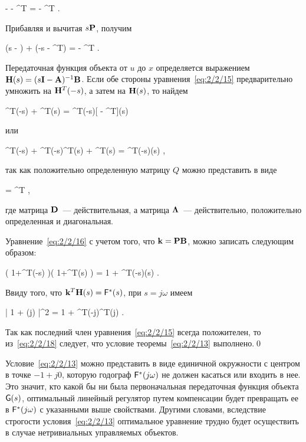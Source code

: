     -  - ^T =  -  ^T \mbox{.}
\eeq

Прибавляя и вычитая $s\mathbf{P}$, получим

    (s - ) + (-s - ^T) =  - ^T \mbox{.}
\eeq

Передаточная функция объекта от $u$ до $x$ определяется выражением $\mathbf{H}(s) = (s\mathbf{I}-\mathbf{A})^{-1}\mathbf{B}$. Если обе стороны уравнения~\vref{eq:2/2/15} предварительно умножить на $\mathbf{H}^T(-s)$, а затем на $\mathbf{H}(s)$, то найдем

\beqn
    ^T(-s)  + ^T(s) = ^T(-s)[ - ^T](s)
\eeqn

или

    ^T(-s) + ^T(-s)^T(s) + ^T(s) = ^T(-s)(s) \mbox{,}
\eeq

так как положительно определенную матрицу $Q$ можно представить в виде\cite{BELLMAN2}

\beqn
     = ^T\m{\Lambda} \mbox{,}
\eeqn

где матрица $\mathbf{D}$~--- действительная, а матрица $\mathbf{\Lambda}$~--- действительно, положительно определенная и диагональная.

Уравнение~\ref{eq:2/2/16} с учетом того, что $\mathbf{k} = \mathbf{P}\mathbf{B}$, можно записать следующим образом:

    \bigl( 1+^T(-s) \bigr)\bigl( 1+^T(s) \bigr) = 1 + ^T(-s)\m{\Lambda}(s) \mbox{.}
\eeq

Ввиду того, что $\mathbf{k}^T\mathbf{H}(s) = \mathsf{F}^{*}(s)$, при $s = j\omega$ имеем

    \bigl| 1 + \funcT(j\omega) \bigr|^2 = 1 + ^T(-j\omega)^T\m{\Lambda}(j\omega) \mbox{.}
\eeq

Так как последний член уравнения~\vref{eq:2/2/15} всегда положителен, то из~\ref{eq:2/2/18} следует, что условие теоремы~\ref{eq:2/2/13} выполнено.\qed

Условие~\ref{eq:2/2/13} можно представить в виде единичной окружности с центром в точке $-1 + j0$, которую годограф $\mathsf{F}^{*}(j\omega)$ не должен касаться или входить в нее. Это значит, кто какой бы ни была первоначальная передаточная функция объекта $\mathsf{G}(s)$, оптимальный линейный регулятор путем компенсации будет превращать ее в $\mathsf{F}^{*}(j\omega)$ с указанными выше свойствами. Другими словами, вследствие строгости условия~\vref{eq:2/2/13} оптимальное уравнение трудно будет осуществить в случае нетривиальных управляемых объектов.

